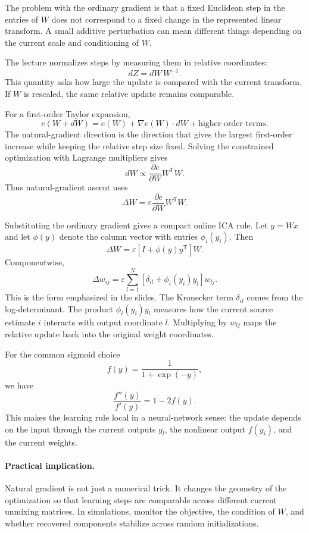 The problem with the ordinary gradient is that a fixed Euclidean step in the entries of \(W\) does not correspond to a fixed change in the represented linear transform. A small additive perturbation can mean different things depending on the current scale and conditioning of \(W\).

The lecture normalizes steps by measuring them in relative coordinates:
\[
  dZ=dW\,W^{-1}.
\]
This quantity asks how large the update is compared with the current transform. If \(W\) is rescaled, the same relative update remains comparable.

For a first-order Taylor expansion,
\[
  e(W+dW)
  =
  e(W)
  +
  \nabla e(W)\cdot dW
  +
  \text{higher-order terms}.
\]
The natural-gradient direction is the direction that gives the largest first-order increase while keeping the relative step size fixed. Solving the constrained optimization with Lagrange multipliers gives
\[
  dW
  \propto
  \frac{\partial e}{\partial W}W^{\mathsf{T}}W.
\]
Thus natural-gradient ascent uses
\[
  \Delta W
  =
  \varepsilon
  \frac{\partial e}{\partial W}W^{\mathsf{T}}W.
\]

Substituting the ordinary gradient gives a compact online ICA rule. Let \(y=Wx\) and let \(\phi(y)\) denote the column vector with entries \(\phi_i(y_i)\). Then
\[
  \Delta W
  =
  \varepsilon
  \left[
    I+\phi(y)y^{\mathsf{T}}
  \right]W.
\]
Componentwise,
\[
  \Delta w_{ij}
  =
  \varepsilon
  \sum_{l=1}^{N}
  \left[
    \delta_{il}
    +
    \phi_i(y_i)y_l
  \right]w_{lj}.
\]
This is the form emphasized in the slides. The Kronecker term \(\delta_{il}\) comes from the log-determinant. The product \(\phi_i(y_i)y_l\) measures how the current source estimate \(i\) interacts with output coordinate \(l\). Multiplying by \(w_{lj}\) maps the relative update back into the original weight coordinates.

For the common sigmoid choice
\[
  f(y)
  =
  \frac{1}{1+\exp(-y)},
\]
we have
\[
  \frac{f''(y)}{f'(y)}
  =
  1-2f(y).
\]
This makes the learning rule local in a neural-network sense: the update depends on the input through the current outputs \(y_l\), the nonlinear output \(f(y_i)\), and the current weights.

\paragraph{Practical implication.}
Natural gradient is not just a numerical trick. It changes the geometry of the optimization so that learning steps are comparable across different current unmixing matrices. In simulations, monitor the objective, the condition of \(W\), and whether recovered components stabilize across random initializations.

